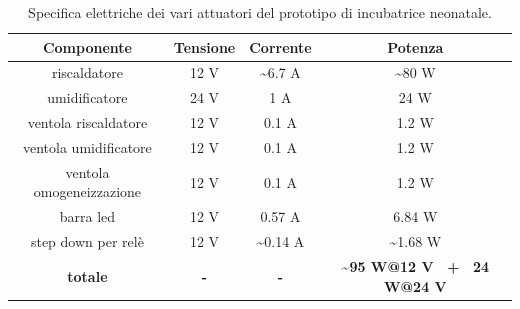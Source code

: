 \begin{table}[htbp]
	\centering
	\begin{tabular}{c|c|c|c}
		\textbf{Componente} & \textbf{Tensione} & \textbf{Corrente} & \textbf{Potenza} \\
		\toprule
		riscaldatore & 12 V & \textasciitilde 6.7 A & \textasciitilde 80 W \\
		\midrule
		umidificatore & 24 V & 1 A & 24 W \\
		\midrule
		ventola riscaldatore & 12 V & 0.1 A & 1.2 W \\
		\midrule
		ventola umidificatore & 12 V & 0.1 A & 1.2 W \\
		\midrule
		ventola omogeneizzazione & 12 V & 0.1 A & 1.2 W \\
		\midrule
		barra led & 12 V & 0.57 A & 6.84 W \\
		\midrule
		step down per relè & 12 V & \textasciitilde 0.14 A & \textasciitilde 1.68 W \\
		\bottomrule
		\textbf{totale} & \textbf{-} & \textbf{-} & \textbf{\textasciitilde 95 W@12 V ~+~ 24 W@24 V}
	\end{tabular}
	\caption{Specifica elettriche dei vari attuatori del prototipo di incubatrice neonatale.}
	\label{tab:specifiche_elettriche}
\end{table}

